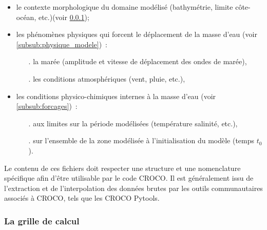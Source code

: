 \documentclass[10pt,a4paper,titlepage]{article}
\begin{document}
\begin{itemize}
    \item le contexte morphologique du domaine modélisé (bathymétrie, limite côte-océan, etc.)(voir \ref{subsub:grille_croco});
    \item les phénomènes physiques qui forcent le déplacement de la masse d'eau (voir \ref{subsub:physique_modele})~:
    \begin{itemize}
        \item[.] la marée (amplitude et vitesse de déplacement des ondes de marée),
        \item[.] les conditions atmosphériques (vent, pluie, etc.),
    \end{itemize}
    \item les conditions physico-chimiques internes à la masse d'eau (voir \ref{subsub:forcages})~:
    \begin{itemize}
        \item[.] aux limites sur la période modélisées (température salinité, etc.),
        \item[.] sur l'ensemble de la zone modélisée à l'initialisation du modèle (temps $t_{0}$).
    \end{itemize}
\end{itemize}
Le contenu de ces fichiers doit respecter une structure et une nomenclature spécifique afin d'être utilisable par le code CROCO.
Il est généralement issu de l'extraction et de l'interpolation des données brutes par les outils communautaires associés à CROCO, tels que les CROCO Pytools.


\subsubsection{La grille de calcul}
\label{subsub:grille_croco}
\end{document}
